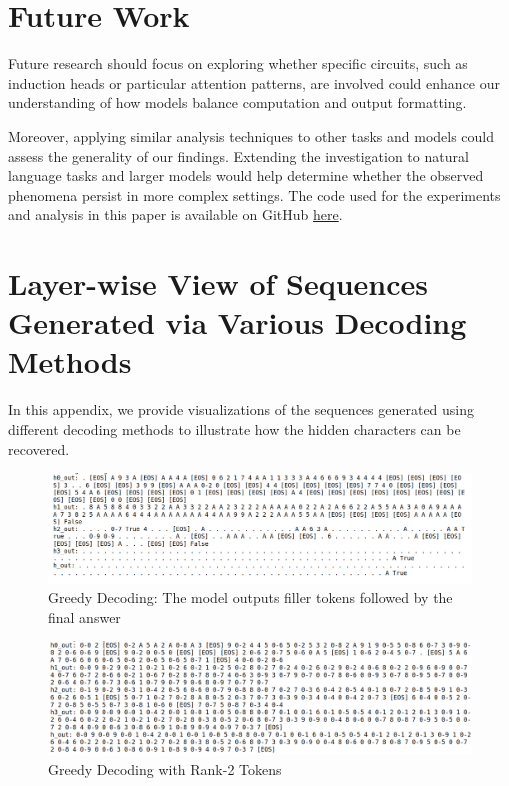 \documentclass{article}
\begin{document}
\section{Future Work}

Future research should focus on exploring whether specific circuits, such as induction heads or particular attention patterns, are involved could enhance our understanding of how models balance computation and output formatting.

Moreover, applying similar analysis techniques to other tasks and models could assess the generality of our findings. Extending the investigation to natural language tasks and larger models would help determine whether the observed phenomena persist in more complex settings.
\vfill
The code used for the experiments and analysis in this paper is available on GitHub \href{https://github.com/rokosbasilisk/filler_tokens}{here}.
\newpage
\appendix

\section{Layer-wise View of Sequences Generated via Various Decoding Methods}

In this appendix, we provide visualizations of the sequences generated using different decoding methods to illustrate how the hidden characters can be recovered.

\begin{figure}[H]
    \centering
    \includegraphics[width=\textwidth]{greedy_decoding.png}
    \caption{Greedy Decoding: The model outputs filler tokens followed by the final answer}
    \label{fig:greedy}
\end{figure}

\begin{figure}[H]
    \centering
    \includegraphics[width=\textwidth]{rank2_decoding.png}
    \caption{Greedy Decoding with Rank-2 Tokens}
    \label{fig:rank2}
\end{figure}
\end{document}
